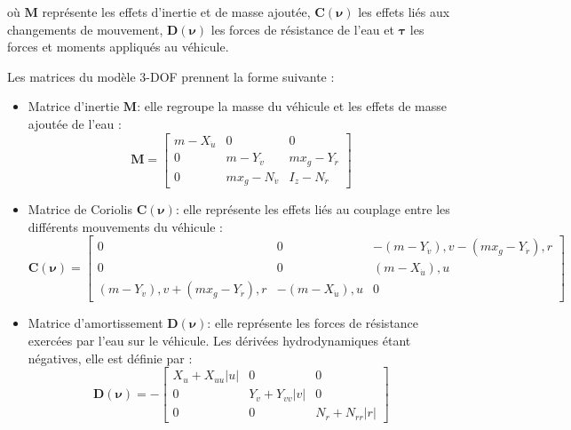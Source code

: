 \documentclass{rapportEILCO}
\begin{document}
où $\boldsymbol{M}$ représente les effets d'inertie et de masse ajoutée, $\boldsymbol{C}(\boldsymbol{\nu})$ les effets liés aux changements de mouvement, $\boldsymbol{D}(\boldsymbol{\nu})$ les forces de résistance de l'eau et $\boldsymbol{\tau}$ les forces et moments appliqués au véhicule.

Les matrices du modèle 3-DOF prennent la forme suivante :

\begin{itemize}
	\item Matrice d'inertie $\boldsymbol{M}$: elle regroupe la masse du véhicule et les effets de masse ajoutée de l'eau :
	\begin{equation}
		\boldsymbol{M} = \begin{bmatrix}
			m - X_{\dot u} & 0 & 0 \\
			0 & m - Y_{\dot v} & m x_g - Y_{\dot r} \\
			0 & m x_g - N_{\dot v} & I_z - N_{\dot r}
		\end{bmatrix}
		\label{eq:M3dof}
	\end{equation}
	
	\item Matrice de Coriolis $\boldsymbol{C}(\boldsymbol{\nu})$: elle représente les effets liés au couplage entre les différents mouvements du véhicule :
	\begin{equation}
		\boldsymbol{C}(\boldsymbol{\nu}) = \begin{bmatrix}
			0 & 0 & -(m - Y_{\dot v}),v - (m x_g - Y_{\dot r}),r \\
			0 & 0 & (m - X_{\dot u}),u \\
			(m - Y_{\dot v}),v + (m x_g - Y_{\dot r}),r & -(m - X_{\dot u}),u & 0
		\end{bmatrix}
		\label{eq:C3dof}
	\end{equation}
	
	\item Matrice d'amortissement $\boldsymbol{D}(\boldsymbol{\nu})$: elle représente les forces de résistance exercées par l'eau sur le véhicule. Les dérivées hydrodynamiques étant négatives, elle est définie par :
	\begin{equation}
		\boldsymbol{D}(\boldsymbol{\nu}) =
		-\begin{bmatrix}
			X_u + X_{uu}|u| & 0 & 0 \\
			0 & Y_v + Y_{vv}|v| & 0 \\
			0 & 0 & N_r + N_{rr}|r|
		\end{bmatrix}
		\label{eq:D3dof}
	\end{equation}
\end{itemize}
\end{document}

